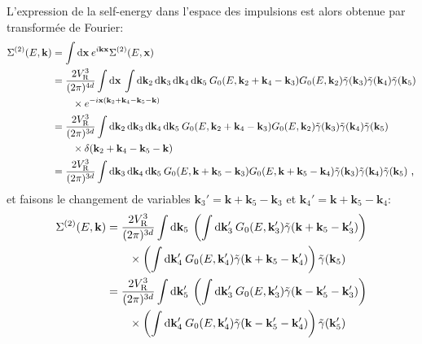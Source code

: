 L'expression de la self-energy dans l'espace des impulsions est alors obtenue par transformée de Fourier: 
\begin{align}
\Sigma^{(2)}(E,\mathbf{k})&=\int{\mathop{}\mathopen{}\mathrm{d}\mathbf{x} \: e^{i \mathbf{k}\mathbf{x}} \Sigma^{(2)}(E,\mathbf{x})} \\
&=\nonumber \frac{2V_{\mathrm{R}}^3}{(2\pi)^{4d}} \int{\mathop{}\mathopen{}\mathrm{d}\mathbf{x} \: \int{\mathop{}\mathopen{}\mathrm{d}\mathbf{k}_{\mathrm{2}}\mathop{}\mathopen{}\mathrm{d}\mathbf{k}_{\mathrm{3}}\mathop{}\mathopen{}\mathrm{d}\mathbf{k}_{\mathrm{4}}\mathop{}\mathopen{}\mathrm{d}\mathbf{k}_{\mathrm{5}}\: G_0(E,\mathbf{k}_{\mathrm{2}}+\mathbf{k}_{\mathrm{4}}-\mathbf{k}_{\mathrm{3}}) G_0(E,\mathbf{k}_{\mathrm{2}})\tilde{\gamma}(\mathbf{k}_{\mathrm{3}})\tilde{\gamma}(\mathbf{k}_{\mathrm{4}})\tilde{\gamma}(\mathbf{k}_{\mathrm{5}})}} \\
& \qquad \times e^{-i \mathbf{x} (\mathbf{k}_{\mathrm{2}} + \mathbf{k}_{\mathrm{4}} - \mathbf{k}_{\mathrm{5}} - \mathbf{k})} \\
&=\nonumber \frac{2V_{\mathrm{R}}^3}{(2\pi)^{3d}} \int{\mathop{}\mathopen{}\mathrm{d}\mathbf{k}_{\mathrm{2}}\mathop{}\mathopen{}\mathrm{d}\mathbf{k}_{\mathrm{3}}\mathop{}\mathopen{}\mathrm{d}\mathbf{k}_{\mathrm{4}}\mathop{}\mathopen{}\mathrm{d}\mathbf{k}_{\mathrm{5}}\: G_0(E,\mathbf{k}_{\mathrm{2}}+\mathbf{k}_{\mathrm{4}}-\mathbf{k}_{\mathrm{3}}) G_0(E,\mathbf{k}_{\mathrm{2}})\tilde{\gamma}(\mathbf{k}_{\mathrm{3}})\tilde{\gamma}(\mathbf{k}_{\mathrm{4}})\tilde{\gamma}(\mathbf{k}_{\mathrm{5}})}\\
& \qquad \times\delta(\mathbf{k}_{\mathrm{2}} + \mathbf{k}_{\mathrm{4}} - \mathbf{k}_{\mathrm{5}} - \mathbf{k}) \\
&= \frac{2V_{\mathrm{R}}^3}{(2\pi)^{3d}} \int{\mathop{}\mathopen{}\mathrm{d}\mathbf{k}_{\mathrm{3}} \mathop{}\mathopen{}\mathrm{d}\mathbf{k}_{\mathrm{4}}\mathop{}\mathopen{}\mathrm{d}\mathbf{k}_{\mathrm{5}} \: G_0(E,\mathbf{k}+\mathbf{k}_{\mathrm{5}}-\mathbf{k}_{\mathrm{3}}) G_0(E,\mathbf{k}+\mathbf{k}_{\mathrm{5}}-\mathbf{k}_{\mathrm{4}})\tilde{\gamma}(\mathbf{k}_{\mathrm{3}})\tilde{\gamma}(\mathbf{k}_{\mathrm{4}})\tilde{\gamma}(\mathbf{k}_{\mathrm{5}})} \text{ ,}
\end{align}
et faisons le changement de variables $\mathbf{k}_{\mathrm{3}}'=\mathbf{k}+\mathbf{k}_{\mathrm{5}}-\mathbf{k}_{\mathrm{3}}$ et $\mathbf{k}_{\mathrm{4}}'=\mathbf{k}+\mathbf{k}_{\mathrm{5}}-\mathbf{k}_{\mathrm{4}}$:
\begin{align}
\Sigma^{(2)}(E,\mathbf{k})&= \frac{2V_{\mathrm{R}}^3}{(2\pi)^{3d}} \int{\mathop{}\mathopen{}\mathrm{d}\mathbf{k}_{\mathrm{5}} \: \left( \int{\mathop{}\mathopen{}\mathrm{d}\mathbf{k}_{\mathrm{3}}'\: G_0(E,\mathbf{k}_{\mathrm{3}}')\tilde{\gamma}(\mathbf{k}+\mathbf{k}_{\mathrm{5}}-\mathbf{k}_{\mathrm{3}}')} \right)} \\
&\nonumber \qquad \times\left( \int{\mathop{}\mathopen{}\mathrm{d}\mathbf{k}_{\mathrm{4}}'\: G_0(E,\mathbf{k}_{\mathrm{4}}') \tilde{\gamma}(\mathbf{k}+\mathbf{k}_{\mathrm{5}}-\mathbf{k}_{\mathrm{4}}')}\right) \tilde{\gamma}(\mathbf{k}_{\mathrm{5}})  \\
&= \frac{2V_{\mathrm{R}}^3}{(2\pi)^{3d}} \int{\mathop{}\mathopen{}\mathrm{d}\mathbf{k}_{\mathrm{5}}' \: \left( \int{\mathop{}\mathopen{}\mathrm{d}\mathbf{k}_{\mathrm{3}}'\: G_0(E,\mathbf{k}_{\mathrm{3}}')\tilde{\gamma}(\mathbf{k}-\mathbf{k}_{\mathrm{5}}'-\mathbf{k}_{\mathrm{3}}')} \right)}\\
&\nonumber\qquad\times \left( \int{\mathop{}\mathopen{}\mathrm{d}\mathbf{k}_{\mathrm{4}}'\: G_0(E,\mathbf{k}_{\mathrm{4}}') \tilde{\gamma}(\mathbf{k}-\mathbf{k}_{\mathrm{5}}'-\mathbf{k}_{\mathrm{4}}')}\right) \tilde{\gamma}(\mathbf{k}_{\mathrm{5}}') 
\end{align}
